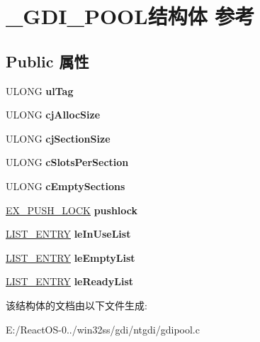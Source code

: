 \hypertarget{struct___g_d_i___p_o_o_l}{}\section{\+\_\+\+G\+D\+I\+\_\+\+P\+O\+O\+L结构体 参考}
\label{struct___g_d_i___p_o_o_l}
\subsection*{Public 属性}
\begin{DoxyCompactItemize}
\item 
\mbox{\label{struct___g_d_i___p_o_o_l_a3c89957de68bb4968b8581599afdb485}} 
U\+L\+O\+NG {\bfseries ul\+Tag}
\item 
\mbox{\label{struct___g_d_i___p_o_o_l_ad27a1bed19f7263bf4f4dc598c91e35d}} 
U\+L\+O\+NG {\bfseries cj\+Alloc\+Size}
\item 
\mbox{\label{struct___g_d_i___p_o_o_l_aa7a0f2c63a17124a796c2110c1cfaedf}} 
U\+L\+O\+NG {\bfseries cj\+Section\+Size}
\item 
\mbox{\label{struct___g_d_i___p_o_o_l_abac33529eb35c78e0e7647ffe9624de4}} 
U\+L\+O\+NG {\bfseries c\+Slots\+Per\+Section}
\item 
\mbox{\label{struct___g_d_i___p_o_o_l_a98e0bf5d2ff27131ca87f382c132ea75}} 
U\+L\+O\+NG {\bfseries c\+Empty\+Sections}
\item 
\mbox{\label{struct___g_d_i___p_o_o_l_a63ddb680044a882214c79148084d61ce}} 
\hyperlink{struct___e_x___p_u_s_h___l_o_c_k}{E\+X\+\_\+\+P\+U\+S\+H\+\_\+\+L\+O\+CK} {\bfseries pushlock}
\item 
\mbox{\label{struct___g_d_i___p_o_o_l_a5f6bccbe21282d0ff712a255bb9e941f}} 
\hyperlink{struct___l_i_s_t___e_n_t_r_y}{L\+I\+S\+T\+\_\+\+E\+N\+T\+RY} {\bfseries le\+In\+Use\+List}
\item 
\mbox{\label{struct___g_d_i___p_o_o_l_ac49c0a853af13f3a0c3b2db12f73e96e}} 
\hyperlink{struct___l_i_s_t___e_n_t_r_y}{L\+I\+S\+T\+\_\+\+E\+N\+T\+RY} {\bfseries le\+Empty\+List}
\item 
\mbox{\label{struct___g_d_i___p_o_o_l_afdca36f4f1e9eda85ea636a8c8d10ff2}} 
\hyperlink{struct___l_i_s_t___e_n_t_r_y}{L\+I\+S\+T\+\_\+\+E\+N\+T\+RY} {\bfseries le\+Ready\+List}
\end{DoxyCompactItemize}


该结构体的文档由以下文件生成\+:\begin{DoxyCompactItemize}
\item 
E\+:/\+React\+O\+S-\/0../win32ss/gdi/ntgdi/gdipool.\+c\end{DoxyCompactItemize}
